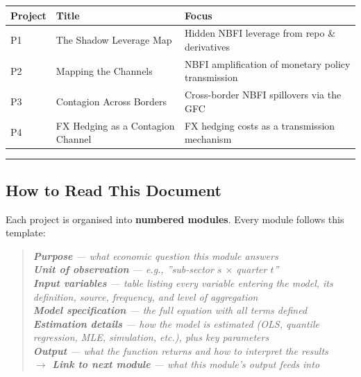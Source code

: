\documentclass[11pt,a4paper]{article}
\begin{document}
{\small
\begin{longtable}{|p{}|p{}|p{}|}
\hline
\textbf{Project} & \textbf{Title} & \textbf{Focus} \\
\hline
\endhead
P1 & The Shadow Leverage Map & Hidden NBFI leverage from repo \& derivatives \\
\hline
P2 & Mapping the Channels & NBFI amplification of monetary policy transmission \\
\hline
P3 & Contagion Across Borders & Cross-border NBFI spillovers via the GFC \\
\hline
P4 & FX Hedging as a Contagion Channel & FX hedging costs as a transmission mechanism \\
\hline
\end{longtable}
}


\bigskip\noindent\rule{\textwidth}{0.4pt}\bigskip


\subsection{How to Read This Document}

Each project is organised into \textbf{numbered modules}. Every module follows this template:


\begin{quote}
\itshape
\textbf{Purpose} --- what economic question this module answers \\

\textbf{Unit of observation} --- e.g., ''sub-sector $s$ $\times$ quarter $t$'' \\

\textbf{Input variables} --- table listing every variable entering the model, its definition, source, frequency, and level of aggregation \\

\textbf{Model specification} --- the full equation with all terms defined \\

\textbf{Estimation details} --- how the model is estimated (OLS, quantile regression, MLE, simulation, etc.), plus key parameters \\

\textbf{Output} --- what the function returns and how to interpret the results \\

\textbf{$\rightarrow$ Link to next module} --- what this module's output feeds into \\
\end{quote}
\end{document}
